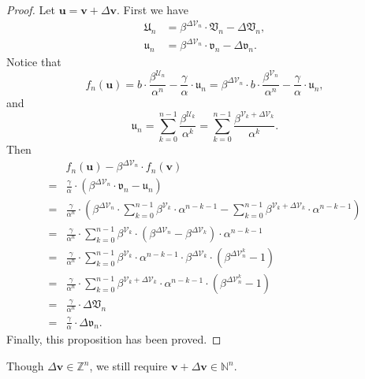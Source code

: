 \begin{proof}
    Let $\bm{u} = \bm{v} + \Delta\bm{v}$. First we have
    \begin{align*}
        \mathfrak{U}_{n} &= \beta^{\Delta\mathcal{V}_n}\cdot\mathfrak{V}_n - \Delta\mathfrak{V}_{n},\\
        \mathfrak{u}_{n} &= \beta^{\Delta\mathcal{V}_n}\cdot\mathfrak{v}_n - \Delta\mathfrak{v}_{n}.
    \end{align*}
    Notice that
    \[f_{n}(\bm{u}) = b \cdot \frac{\beta^{\mathcal{U}_{n}}}{\alpha^{n}} - \frac{\gamma}{\alpha}\cdot \mathfrak{u}_{n} = \beta^{\Delta\mathcal{V}_n} \cdot b\cdot \frac{\beta^{\mathcal{V}_{n}}}{\alpha^{n}} - \frac{\gamma}{\alpha}\cdot \mathfrak{u}_{n},\]
    and
    \[ \mathfrak{u}_{n} = \sum_{k=0}^{n-1}\frac{\beta^{\mathcal{U}_k}}{\alpha^{k}} = \sum_{k=0}^{n-1}\frac{\beta^{\mathcal{V}_k + \Delta\mathcal{V}_k}}{\alpha^{k}}. \]
    Then
    \begin{align*}
        & f_{n}(\bm{u}) - \beta^{\Delta\mathcal{V}_{n}}\cdot f_{n}(\bm{v}) \\
        =& \frac{\gamma}{\alpha}\cdot\left(\beta^{\Delta\mathcal{V}_{n}}\cdot\mathfrak{v}_{n} - \mathfrak{u}_{n} \right) \\
        =&\frac{\gamma}{\alpha^{n}}\cdot\left(\beta^{\Delta\mathcal{V}_{n}}\cdot\sum_{k=0}^{n-1}\beta^{\mathcal{V}_{k}}\cdot\alpha^{n-k-1} - \sum_{k=0}^{n-1}\beta^{\mathcal{V}_{k}+\Delta\mathcal{V}_{k}}\cdot\alpha^{n-k-1} \right) \\
        =&\frac{\gamma}{\alpha^{n}}\cdot\sum_{k=0}^{n-1}\beta^{\mathcal{V}_{k}}\cdot(\beta^{\Delta\mathcal{V}_{n}} - \beta^{\Delta\mathcal{V}_{k}})\cdot\alpha^{n-k-1} \\
        =&\frac{\gamma}{\alpha^{n}}\cdot\sum_{k=0}^{n-1}\beta^{\mathcal{V}_{k}}\cdot\alpha^{n-k-1}\cdot\beta^{\Delta\mathcal{V}_{k}}\cdot(\beta^{\Delta\mathcal{V}_{n}^{k}} - 1) \\
        =&\frac{\gamma}{\alpha^{n}}\cdot\sum_{k=0}^{n-1}\beta^{\mathcal{V}_{k} + \Delta\mathcal{V}_{k}}\cdot\alpha^{n-k-1}\cdot(\beta^{\Delta\mathcal{V}_{n}^{k}} - 1)\\
        =&\frac{\gamma}{\alpha^{n}}\cdot \Delta\mathfrak{V}_{n}
        \\
        =&\frac{\gamma}{\alpha}\cdot \Delta\mathfrak{v}_{n}.
    \end{align*}
    Finally, this proposition has been proved.
\end{proof}
Though $\Delta\bm{v} \in \mathbb{Z}^{n}$, we still require $\bm{v} + \Delta\bm{v} \in\mathbb{N}^{n}$.
